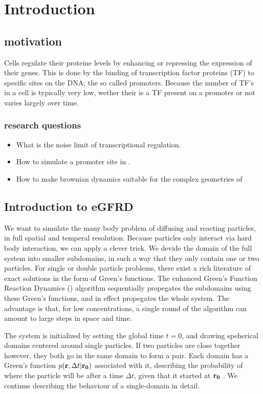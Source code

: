 \section{Introduction}

\subsection{motivation}
Cells regulate their proteine levels by enhancing or repressing the expression of their genes. This is done by the binding of transcription factor proteins (TF) to specific sites on the DNA; the so called promoters. Because the number of TF's in a cell is typically very low, wether their is a TF present on a promoter or not varies largely over time. 

\subsubsection{research questions}
\begin{itemize}
 \item What is the noise limit of transcriptional regulation.
 \item How to simulate a promoter site in \GFRD.
 \item How to make brownian dynamics suitable for the complex geometries of \GFRD
\end{itemize}



\subsection{Introduction to eGFRD}
We want to simulate the many body problem of diffusing and reacting particles, in full spatial and temperal resolution. Because particles only interact via hard body interaction, we can apply a clever trick. We devide the domain of the full system into smaller subdomains, in such a way that they only contain one or two particles. For single or double particle problems, there exist a rich literature of exact solutions in the form of Green's functions. The enhanced Green's Function Reaction Dynamics (\GFRD) algorithm sequentially propegates the subdomains using these Green's functions, and in effect propegates the whole system. \cite{VanZon2006}\cite{VanZon2005}\cite{Takahashi2010} The advantage is that, for low concentrations, a single round of the algorithm can amount to large steps in space and time. 

The system is initialized by setting the global time $t=0$, and drawing speherical domains centered around single particles. If two particles are close together however, they both go in the same domain to form a pair. Each domain has a Green's function $p({\bf r}, \Delta t|{\bf r_0})$ associated with it, describing the probability of where the particle will be after a time $\Delta t$, given that it started at ${\bf r_0}$ \cite{Carslaw1959}. We continue describing the behaviour of a single-domain in detail.


